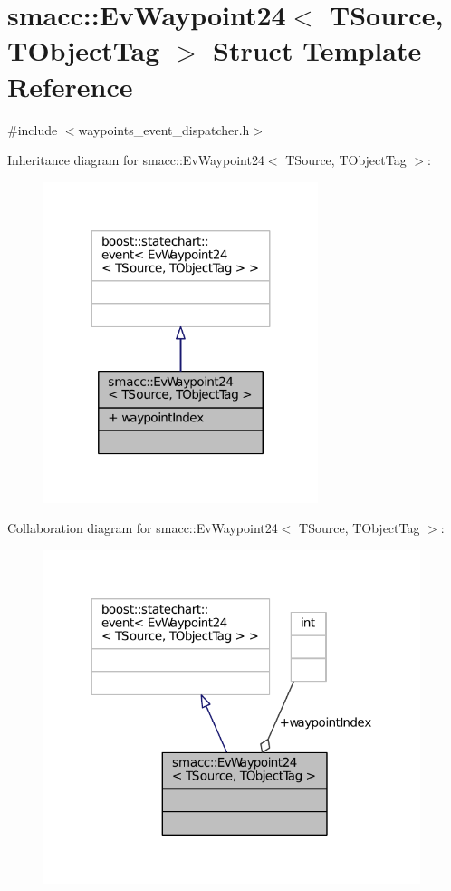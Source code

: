 \hypertarget{structsmacc_1_1EvWaypoint24}{}\section{smacc\+:\+:Ev\+Waypoint24$<$ T\+Source, T\+Object\+Tag $>$ Struct Template Reference}
\label{structsmacc_1_1EvWaypoint24}


{\ttfamily \#include $<$waypoints\+\_\+event\+\_\+dispatcher.\+h$>$}



Inheritance diagram for smacc\+:\+:Ev\+Waypoint24$<$ T\+Source, T\+Object\+Tag $>$\+:
\nopagebreak
\begin{figure}[H]
\begin{center}
\leavevmode
\includegraphics[width=227pt]{structsmacc_1_1EvWaypoint24__inherit__graph}
\end{center}
\end{figure}


Collaboration diagram for smacc\+:\+:Ev\+Waypoint24$<$ T\+Source, T\+Object\+Tag $>$\+:
\nopagebreak
\begin{figure}[H]
\begin{center}
\leavevmode
\includegraphics[width=312pt]{structsmacc_1_1EvWaypoint24__coll__graph}
\end{center}
\end{figure}
